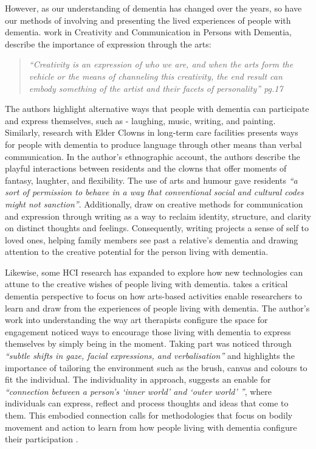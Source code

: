 However, as our understanding of dementia has changed over the years, so have our methods of involving and presenting the lived experiences of people with dementia. \cite{john_killick_claire_craig_creativity_2012} work in Creativity and Communication in Persons with Dementia, describe the importance of expression through the arts: 

\begin{quote}\textit{``Creativity is an expression of who we are, and when the arts form the vehicle or the means of channeling this creativity, the end result can embody something of the artist and their facets of personality'' \cite{john_killick_claire_craig_creativity_2012} pg.17}
\end{quote}

The authors highlight alternative ways that people with dementia can participate and express themselves, such as - laughing, music, writing, and painting. Similarly, \cite{kontos_presence_2015} research with Elder Clowns in long-term care facilities presents ways for people with dementia to produce language through other means than verbal communication. In the author's ethnographic account, the authors describe the playful interactions between residents and the clowns that offer moments of fantasy, laughter, and flexibility. The use of arts and humour gave residents \textit{``a sort of permission to behave in a way that conventional social and cultural codes might not sanction''}. Additionally, \cite{ryan_dementia_2009} draw on creative methods for communication and expression through writing as a way to reclaim identity, structure, and clarity on distinct thoughts and feelings. Consequently, writing projects a sense of self to loved ones, helping family members see past a relative's dementia and drawing attention to the creative potential for the person living with dementia. 

Likewise, some HCI research has expanded to explore how new technologies can attune to the creative wishes of people living with dementia. \cite{lazar_critical_2017} takes a critical dementia perspective to focus on how arts-based activities enable researchers to learn and draw from the experiences of people living with dementia. The author's work into understanding the way art therapists configure the space for engagement noticed ways to encourage those living with dementia to express themselves by simply being in the moment. Taking part was noticed through \textit{``subtle shifts in gaze, facial expressions, and verbalisation''} and highlights the importance of tailoring the environment such as the brush, canvas and colours to fit the individual. The individuality in approach, suggests an enable for \textit{``connection between a person's `inner world' and `outer world' ''}, where individuals can express, reflect and process thoughts and ideas that come to them. This embodied connection calls for methodologies that focus on bodily movement and action to learn from how people living with dementia configure their participation \citep{morrissey_creative_2015}.

